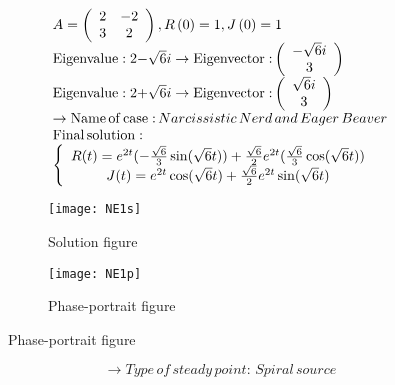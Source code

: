 \documentclass[a4paper]{article}
\begin{document}
\[\begin{array}{l}
A = \left( {\begin{array}{*{20}{c}}
2&{ - 2}\\
3&2
\end{array}} \right),R\left( 0 \right) = 1,J\left( 0 \right) = 1\\
{\rm{Eigenvalue:2 - }}\sqrt 6 i \to {\rm{Eigenvector:}}\left( {\begin{array}{*{20}{c}}
{ - \sqrt 6 i}\\
3
\end{array}} \right)\\
{\rm{Eigenvalue:2 + }}\sqrt 6 i \to {\rm{Eigenvector:}}\left( {\begin{array}{*{20}{c}}
{\sqrt 6 i}\\
3
\end{array}} \right)\\
 \to {\rm{Name}}\,{\rm{of}}\,{\rm{case:}}\,Narcissistic\,Nerd\,and\,Eager\,Beaver\\
{\rm{Final}}\,{\rm{solution:}}\\
\left\{ {\begin{array}{*{20}{c}}
{R(t) = {e^{2t}}( - \frac{{\sqrt 6 }}{3}\sin (\sqrt 6 t)) + \frac{{\sqrt 6 }}{2}{e^{2t}}(\frac{{\sqrt 6 }}{3}\cos (\sqrt 6 t))}\\
{J(t) = {e^{2t}}\cos (\sqrt 6 t) + \frac{{\sqrt 6 }}{2}{e^{2t}}\sin (\sqrt 6 t)}
\end{array}} \right.
\end{array}\]
\begin{figure}[H]
\centering
\begin{subfigure}{.5\textwidth}
  \centering
  \texttt{[image: NE1s]}
  \caption*{Solution figure}
\end{subfigure}%
\begin{subfigure}{.5\textwidth}
  \centering
  \texttt{[image: NE1p]}
  \caption*{Phase-portrait figure}
\end{subfigure}
\end{figure}
\[  \to  Type\,of\,steady\,point:\,Spiral\,source\]
\end{document}
